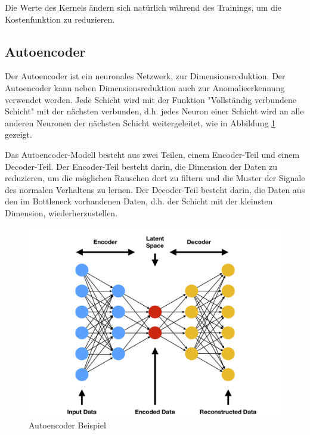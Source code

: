 \documentclass[12pt,a4paper]{scrartcl}
\numberwithin{equation}{section}
\begin{document}
Die Werte des Kernels ändern sich natürlich während des Trainings, um die Kostenfunktion zu reduzieren.

\subsection{Autoencoder}

Der Autoencoder ist ein neuronales Netzwerk, zur Dimensionsreduktion. Der Autoencoder kann neben Dimensionsreduktion auch zur Anomalieerkennung verwendet werden. Jede Schicht wird mit der Funktion "Vollständig verbundene Schicht" mit der nächsten verbunden, d.h. jedes Neuron einer Schicht wird an alle anderen Neuronen der nächsten Schicht weitergeleitet, wie in Abbildung \ref{autoencoder} gezeigt.

Das Autoencoder-Modell besteht aus zwei Teilen, einem Encoder-Teil und einem Decoder-Teil. Der Encoder-Teil besteht darin, die Dimension der Daten zu reduzieren, um die möglichen Rauschen dort zu filtern und die Muster der Signale des normalen Verhaltens zu lernen. Der Decoder-Teil besteht darin, die Daten aus den im Bottleneck vorhandenen Daten, d.h. der Schicht mit der kleinsten Dimension, wiederherzustellen. 


\begin{figure}[ht!]
	\centering
	  \includegraphics[scale=0.11]{autoencoder.png}
	  \caption[Autoencoder Beispiel]{Autoencoder Beispiel\footnotemark}
	\label{autoencoder}
\end{figure}

\end{document}
